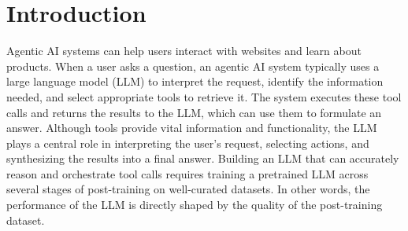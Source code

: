 \section{Introduction}

Agentic AI systems can help users interact with websites and learn about products.
When a user asks a question, an agentic AI system typically uses a large language model (LLM) to interpret the request, identify the information needed, and select appropriate tools to retrieve it. 
The system executes these tool calls and returns the results to the LLM, which can use them to formulate an answer. 
Although tools provide vital information and functionality, the LLM plays a central role in interpreting the user’s request, selecting actions, and synthesizing the results into a final answer.
Building an LLM that can accurately reason and orchestrate tool calls requires training a pretrained LLM across several stages of post-training on well-curated datasets. 
In other words, the performance of the LLM is directly shaped by the quality of the post-training dataset. 

